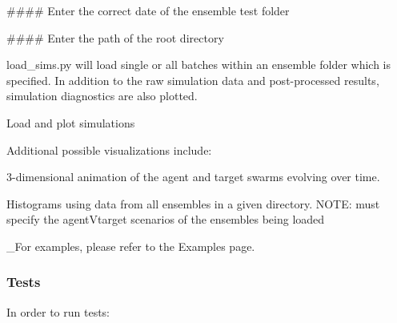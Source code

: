 \#\#\#\# Enter the correct date of the ensemble test folder 
\begin{DoxyCode}{0}
\end{DoxyCode}


\#\#\#\# Enter the path of the root directory 
\begin{DoxyCode}{0}
\DoxyCodeLine{}
\DoxyCodeLine{}
\DoxyCodeLine{\#\#\#\#\#\#\#\#\#\#\#\#\#\#\#\#\#\#\#\#\#\#\#\#\#\#\#\#\#\#\#\#\#\#\#\#\#\#\#\#\#\#\#\#\#\#\#\#\#\#\#\#\#\#\#\#\#\#\#\#\#\#\#\#\#\#\#\#\#\#\#\#\#}
\end{DoxyCode}


load\+\_\+sims.\+py will load single or all batches within an ensemble folder which is specified. In addition to the raw simulation data and post-\/processed results, simulation diagnostics are also plotted.

Load and plot simulations 
\begin{DoxyCode}{0}
\end{DoxyCode}


Additional possible visualizations include\+:
\begin{DoxyItemize}
\item 3-\/dimensional animation of the agent and target swarms evolving over time.
\item Histograms using data from all ensembles in a given directory. N\+O\+TE\+: must specify the \textquotesingle{}agent\textquotesingle{}V\textquotesingle{}target\textquotesingle{} scenarios of the ensembles being loaded
\end{DoxyItemize}

\+\_\+\+For examples, please refer to the Examples page.

\subsubsection*{Tests}

In order to run tests\+:


